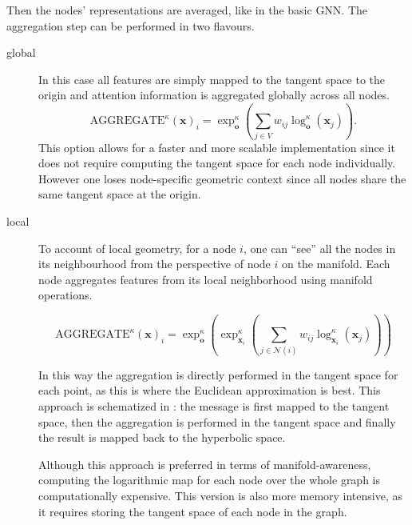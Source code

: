 Then the nodes' representations are averaged, like in the basic GNN. The aggregation step can be performed in two flavours.
\begin{description}
    \item[global] 
    In this case all features are simply mapped to the tangent space to the origin and attention information is aggregated globally across all nodes. 
    \begin{equation*}
        \text{AGGREGATE}^\kappa(\mathbf{x})_i = \exp_{\mathbf{o}}^\kappa\left(\sum_{j\in V}w_{ij}\log_{\mathbf{o}}^\kappa\left(\mathbf{x}_j\right)\right).
    \end{equation*}    
    This option allows for a faster and more scalable implementation since it does not require computing the tangent space for each node individually. However one loses node-specific geometric context since all nodes share the same tangent space at the origin.

    \item[local]
    To account of local geometry, for a node $i$, one can ``see'' all the nodes in its neighbourhood from the perspective of node $i$ on the manifold.
    Each node aggregates features from its local neighborhood using manifold operations.

    \begin{equation*}
        \text{AGGREGATE}^\kappa(\mathbf{x})_i = \exp_{\mathbf{o}}^\kappa\left(\exp_{\mathbf{x}_i}^\kappa\left(\sum_{j\in\mathcal{N}(i)}w_{ij}\log_{\mathbf{x}_i}^\kappa\left(\mathbf{x}_j\right)\right)\right)
    \end{equation*}

    In this way the aggregation is directly performed in the tangent space for each point, as this is where the Euclidean approximation is best. This approach is schematized in : the message is first mapped to the tangent space, then the aggregation is performed in the tangent space and finally the result is mapped back to the hyperbolic space.

    

    Although this approach is preferred in terms of manifold-awareness, computing the logarithmic map for each node over the whole graph is computationally expensive. This version is also more memory intensive, as it requires storing the tangent space of each node in the graph.


\end{description}






